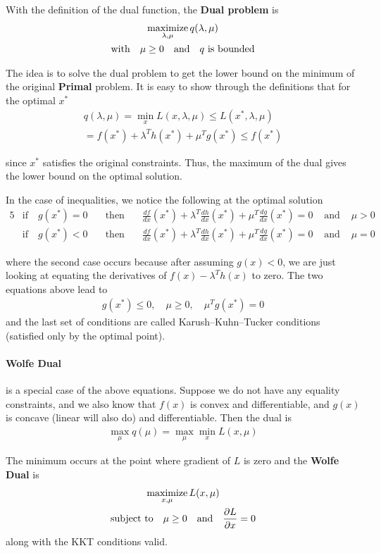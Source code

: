 \documentclass[../statistical_learning_notes.tex]{subfiles}
\begin{document}
With the definition of the dual function, the \textbf{Dual problem} is
\begin{gather*}
    \operatorname*{maximize}_{\lambda, \mu} q(\lambda, \mu)\\
    \text{with} \quad \mu \geq 0 \quad \text{and} \quad q \text{ is bounded}
\end{gather*}

The idea is to solve the dual problem to get the lower bound on the minimum of the original \textbf{Primal} problem. It is easy to show through the definitions that for the optimal $x^{*}$
\begin{align*}
    q(\lambda, \mu) = \min_{x} L(x, \lambda, \mu) \leq L(x^{*}, \lambda, \mu)\\
    = f(x^{*}) + \lambda^{T}h(x^{*}) + \mu^{T}g(x^{*}) \leq f(x^{*})
\end{align*}

since $x^{*}$ satisfies the original constraints. Thus, the maximum of the dual gives the lower bound on the optimal solution.\newline

In the case of inequalities, we notice the following at the optimal solution
\begin{alignat*}{5}
    &\text{if} \quad g(x^{*}) = 0 \quad &\text{then} \quad &\frac{df}{dx}(x^{*}) +\lambda^{T} \frac{dh}{dx}(x^{*}) + \mu^{T} \frac{dg}{dx}(x^{*}) = 0 &\text{ and } &\mu > 0\\
    &\text{if} \quad g(x^{*}) < 0 \quad &\text{then} \quad &\frac{df}{dx}(x^{*}) +\lambda^{T} \frac{dh}{dx}(x^{*}) + \mu^{T} \frac{dg}{dx}(x^{*}) = 0 &\text{ and } &\mu = 0
\end{alignat*}

where the second case occurs because after assuming $g(x) < 0$, we are just looking at equating the derivatives of $f(x) - \lambda^{T}h(x)$ to zero. The two equations above lead to
\begin{align*}
    g(x^{*}) \leq 0, \quad \mu \geq 0, \quad \mu^{T}g(x^{*}) = 0
\end{align*}
and the last set of conditions are called Karush–Kuhn–Tucker conditions (satisfied only by the optimal point).

\paragraph{Wolfe Dual} is a special case of the above equations. Suppose we do not have any equality constraints, and we also know that $f(x)$ is convex and differentiable, and $g(x)$ is concave (linear will also do) and differentiable. Then the dual is
\begin{align*}
     \max_{\mu} q(\mu) = \max_{\mu} \min_{x} L(x, \mu)
\end{align*}

The minimum occurs at the point where gradient of $L$ is zero and the \textbf{Wolfe Dual} is
\begin{gather*}
    \operatorname*{maximize}_{x, \mu} L(x, \mu)\\
    \text{subject to} \quad \mu \geq 0 \quad \text{and} \quad \frac{\partial L}{\partial x}=0
\end{gather*}
along with the KKT conditions valid.
\end{document}
